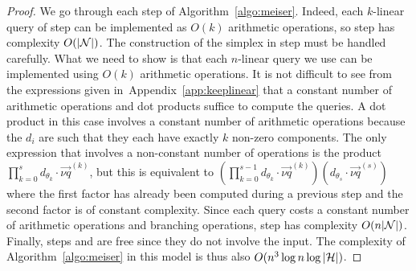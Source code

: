 \begin{proof}
We go through each step of Algorithm~\ref{algo:meiser}.
Indeed, each \(k\)-linear query of step  can be implemented as
\(O(k)\) arithmetic operations, so step  has complexity
\(O(|{\mathcal{N}}|)\).
The construction of the simplex in step  must be handled carefully.
What we need to show is that each \(n\)-linear query we use can be implemented
using $O(k)$ arithmetic operations. It is not difficult to see from the
expressions given in~Appendix~\ref{app:keeplinear} that a constant number of arithmetic
operations and dot products suffice to
compute the queries. A dot product in this case involves a constant number
of arithmetic operations because the \(d_i\) are such that they each have
exactly \(k\) non-zero components. The only expression that involves a
non-constant number of operations is the product \(\prod_{k=0}^{s}
d_{\theta_{k}} \cdot \vec{\nu q}^{(k)}\), but this is equivalent to
\((\prod_{k=0}^{s-1}
	d_{\theta_{k}} \cdot \vec{\nu q}^{(k)})(d_{\theta_{s}} \cdot
	\vec{\nu q}^{(s)})\)
where the first factor has already been computed during a previous step and
the second factor is of constant complexity. Since each query costs a constant
number of arithmetic operations and branching operations, step 
has complexity \(O(n|{\mathcal{N}}|)\).
Finally, steps  and  are free since they do not involve the
input. The complexity of Algorithm~\ref{algo:meiser} in this model is thus also \(O(n^3
\log n \log |{\mathcal{H}}|)\).
\end{proof}

